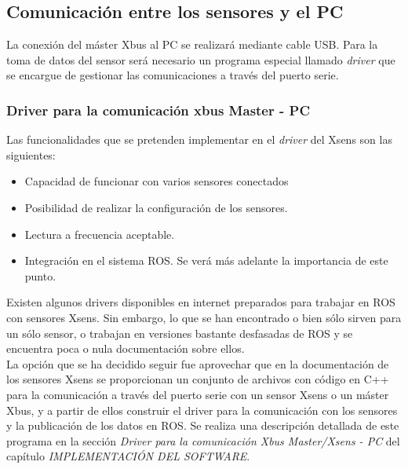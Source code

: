 \documentclass[12pt, a4paper]{report}
\begin{document}
\subsection{Comunicación entre los sensores y el PC}

La conexión del máster Xbus al PC se realizará mediante cable USB. Para la toma de datos del sensor será necesario un programa especial llamado \textit{driver} que se encargue de gestionar las comunicaciones a través del puerto serie.

\subsubsection{Driver para la comunicación xbus Master - PC}

Las funcionalidades que se pretenden implementar en el \textit{driver} del Xsens son las siguientes:

\begin{itemize}

\item Capacidad de funcionar con varios sensores conectados

\item Posibilidad de realizar la configuración de los sensores.

\item Lectura a frecuencia aceptable.

\item Integración en el sistema ROS. Se verá más adelante la importancia de este punto.

\end{itemize}

Existen algunos drivers disponibles en internet preparados para trabajar en ROS con sensores Xsens. Sin embargo, lo que se han encontrado o bien sólo sirven para un sólo sensor, o trabajan en versiones bastante desfasadas de ROS y se encuentra poca o nula documentación sobre ellos. \\

La opción que se ha decidido seguir fue aprovechar que en la documentación de los sensores Xsens se proporcionan un conjunto de archivos con código en C++ para la comunicación a través del puerto serie con un sensor Xsens o un máster Xbus, y a partir de ellos construir el driver para la comunicación con los sensores y la publicación de los datos en ROS. Se realiza una descripción detallada de este programa en la sección \textit{Driver para la comunicación Xbus Master/Xsens - PC} del capítulo \textit{IMPLEMENTACIÓN DEL SOFTWARE}. 
\end{document}
